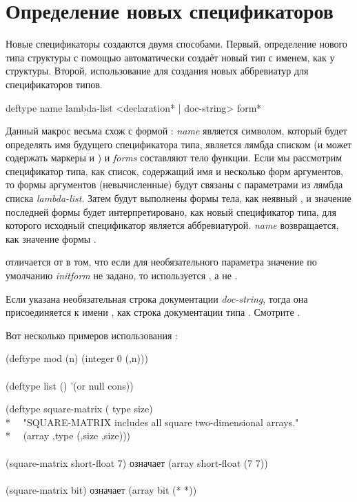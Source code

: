 \section{Определение новых спецификаторов}

Новые спецификаторы создаются двумя способами.
Первый, определение нового типа структуры с помощью  автоматически
создаёт новый тип с именем, как у структуры.
Второй, использование  для создания новых аббревиатур для
спецификаторов типов.

\begin{defmac}
deftype name lambda-list
  <{declaration}* | doc-string>
  {form}*

Данный макрос весьма схож с формой : \emph{name} является
символом, который будет определять имя будущего спецификатора типа,
 является лямбда списком (и может содержать маркеры  и
) и \emph{forms} составляют тело функции. Если мы рассмотрим
спецификатор типа, как список, содержащий имя и несколько форм аргументов, то
формы аргументов (невычисленные) будут связаны с параметрами из лямбда списка
\emph{lambda-list}. Затем будут выполнены формы тела, как неявный ,
и значение последней формы будет интерпретировано, как новый спецификатор типа,
для которого исходный спецификатор является аббревиатурой. \emph{name}
возвращается, как значение формы .

 отличается от  в том, что если для необязательного 
параметра значение по умолчанию \emph{initform} не задано, то используется
\cdf{*}, а не {\nil}.

Если указана необязательная строка документации \emph{doc-string}, тогда она
присоединяется к имени , как строка документации типа .
Смотрите .

Вот несколько примеров использования :
\begin{lisp}
(deftype mod (n) {\Xbq}(integer 0 (,n))) \\
 \\
(deftype list () '(or null cons))
\end{lisp}

\begin{lisp}
(deftype square-matrix ( type size) \\*
~~"SQUARE-MATRIX includes all square two-dimensional arrays." \\*
~~{\Xbq}(array ,type (,size ,size))) \\
 \\
(square-matrix short-float 7)  \textrm{означает}  (array short-float (7 7)) \\
 \\
(square-matrix bit)  \textrm{означает}  (array bit (* *))
\end{lisp}


\end{defmac}

